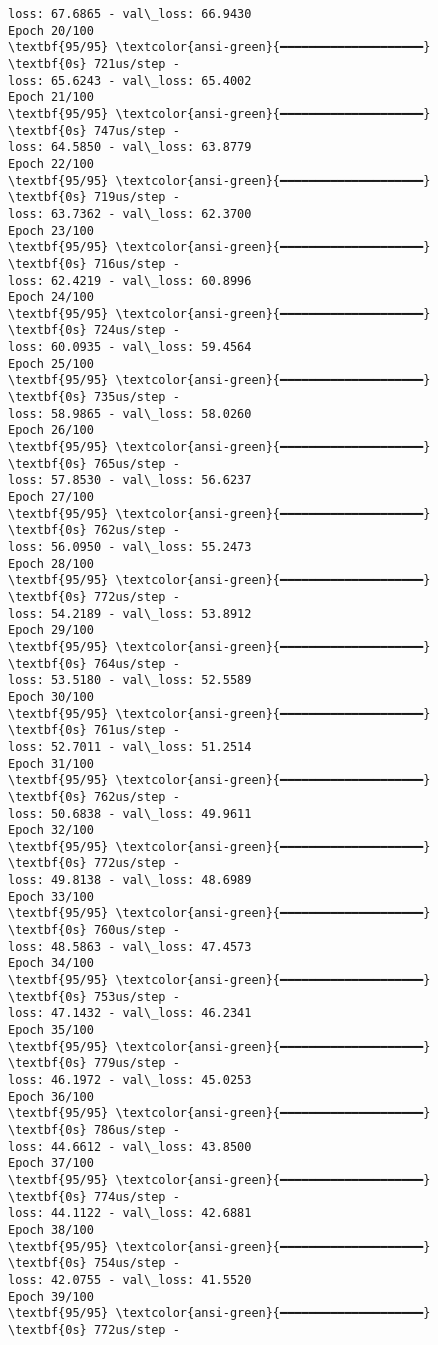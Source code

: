 \documentclass[11pt]{article}
\begin{document}
\begin{Verbatim}[commandchars=\\\{\}]
loss: 67.6865 - val\_loss: 66.9430
Epoch 20/100
\textbf{95/95} \textcolor{ansi-green}{━━━━━━━━━━━━━━━━━━━━} \textbf{0s} 721us/step -
loss: 65.6243 - val\_loss: 65.4002
Epoch 21/100
\textbf{95/95} \textcolor{ansi-green}{━━━━━━━━━━━━━━━━━━━━} \textbf{0s} 747us/step -
loss: 64.5850 - val\_loss: 63.8779
Epoch 22/100
\textbf{95/95} \textcolor{ansi-green}{━━━━━━━━━━━━━━━━━━━━} \textbf{0s} 719us/step -
loss: 63.7362 - val\_loss: 62.3700
Epoch 23/100
\textbf{95/95} \textcolor{ansi-green}{━━━━━━━━━━━━━━━━━━━━} \textbf{0s} 716us/step -
loss: 62.4219 - val\_loss: 60.8996
Epoch 24/100
\textbf{95/95} \textcolor{ansi-green}{━━━━━━━━━━━━━━━━━━━━} \textbf{0s} 724us/step -
loss: 60.0935 - val\_loss: 59.4564
Epoch 25/100
\textbf{95/95} \textcolor{ansi-green}{━━━━━━━━━━━━━━━━━━━━} \textbf{0s} 735us/step -
loss: 58.9865 - val\_loss: 58.0260
Epoch 26/100
\textbf{95/95} \textcolor{ansi-green}{━━━━━━━━━━━━━━━━━━━━} \textbf{0s} 765us/step -
loss: 57.8530 - val\_loss: 56.6237
Epoch 27/100
\textbf{95/95} \textcolor{ansi-green}{━━━━━━━━━━━━━━━━━━━━} \textbf{0s} 762us/step -
loss: 56.0950 - val\_loss: 55.2473
Epoch 28/100
\textbf{95/95} \textcolor{ansi-green}{━━━━━━━━━━━━━━━━━━━━} \textbf{0s} 772us/step -
loss: 54.2189 - val\_loss: 53.8912
Epoch 29/100
\textbf{95/95} \textcolor{ansi-green}{━━━━━━━━━━━━━━━━━━━━} \textbf{0s} 764us/step -
loss: 53.5180 - val\_loss: 52.5589
Epoch 30/100
\textbf{95/95} \textcolor{ansi-green}{━━━━━━━━━━━━━━━━━━━━} \textbf{0s} 761us/step -
loss: 52.7011 - val\_loss: 51.2514
Epoch 31/100
\textbf{95/95} \textcolor{ansi-green}{━━━━━━━━━━━━━━━━━━━━} \textbf{0s} 762us/step -
loss: 50.6838 - val\_loss: 49.9611
Epoch 32/100
\textbf{95/95} \textcolor{ansi-green}{━━━━━━━━━━━━━━━━━━━━} \textbf{0s} 772us/step -
loss: 49.8138 - val\_loss: 48.6989
Epoch 33/100
\textbf{95/95} \textcolor{ansi-green}{━━━━━━━━━━━━━━━━━━━━} \textbf{0s} 760us/step -
loss: 48.5863 - val\_loss: 47.4573
Epoch 34/100
\textbf{95/95} \textcolor{ansi-green}{━━━━━━━━━━━━━━━━━━━━} \textbf{0s} 753us/step -
loss: 47.1432 - val\_loss: 46.2341
Epoch 35/100
\textbf{95/95} \textcolor{ansi-green}{━━━━━━━━━━━━━━━━━━━━} \textbf{0s} 779us/step -
loss: 46.1972 - val\_loss: 45.0253
Epoch 36/100
\textbf{95/95} \textcolor{ansi-green}{━━━━━━━━━━━━━━━━━━━━} \textbf{0s} 786us/step -
loss: 44.6612 - val\_loss: 43.8500
Epoch 37/100
\textbf{95/95} \textcolor{ansi-green}{━━━━━━━━━━━━━━━━━━━━} \textbf{0s} 774us/step -
loss: 44.1122 - val\_loss: 42.6881
Epoch 38/100
\textbf{95/95} \textcolor{ansi-green}{━━━━━━━━━━━━━━━━━━━━} \textbf{0s} 754us/step -
loss: 42.0755 - val\_loss: 41.5520
Epoch 39/100
\textbf{95/95} \textcolor{ansi-green}{━━━━━━━━━━━━━━━━━━━━} \textbf{0s} 772us/step -

\end{Verbatim}
\end{document}
